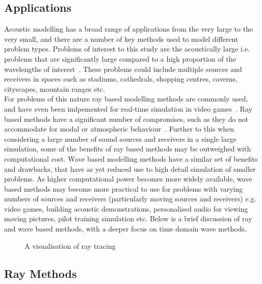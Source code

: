 \documentclass{svproc}
\begin{document}
\subsection{Applications}
Acoustic modelling has a broad range of applications from the very large to the very small, and there are a number of key methods used to model different problem types. Problems of interest to this study are the acoustically large i.e. problems that are significantly large compared to a high proportion of the wavelengths of interest~\cite{Everest2009}. These problems could include multiple sources and receivers in spaces such as stadiums, cathedrals, shopping centres, caverns, cityscapes, mountain ranges etc.\\ For problems of this nature ray based modelling methods are commonly used, and have even been imlpemented for real-time simulation in video games~\cite{Bengtsson2009}. Ray based methods have a significant number of compromises, such as they do not accommodate for modal or atmospheric behaviour~\cite{Elorza2005}. Further to this when considering a large number of sound sources and receivers in a single large simulation, some of the benefits of ray based methods may be outweighed with computational cost. Wave based modelling methods have a similar set of benefits and drawbacks, that have as yet reduced use to high detail simulation of smaller problems. As higher computational power becomes more widely available, wave based methods may become more practical to use for problems with varying numbers of sources and receivers (particularly moving sources and receivers) e.g. video games, building acoustic demonstrations, personalised audio for viewing moving pictures, pilot training simulation etc. Below is a brief discussion of ray and wave based methods, with a deeper focus on time domain wave methods.
\begin{figure}
\centering
\centering
\caption{A visualisation of ray tracing~\cite{Rober2007}}
\end{figure} 

\subsection{Ray Methods}
\end{document}
